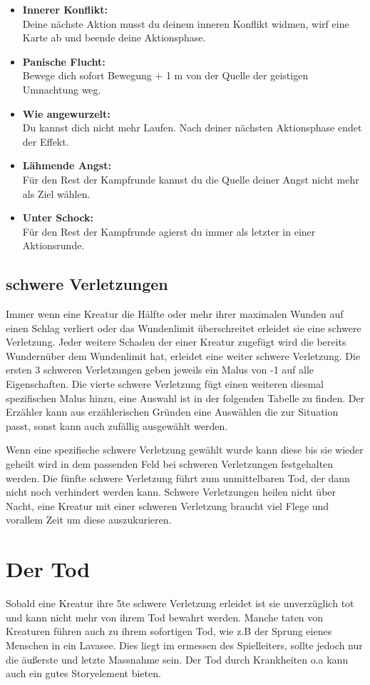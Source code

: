 \begin{itemize}
    \item \textbf{Innerer Konflikt:}\\
    Deine nächste Aktion musst du deinem inneren Konflikt widmen, wirf eine Karte ab und beende deine Aktionsphase.
    \item \textbf{Panische Flucht:}\\
    Bewege dich sofort Bewegung + 1 m von der Quelle der geistigen Umnachtung weg.  
    \item \textbf{Wie angewurzelt:}\\
    Du kannst dich nicht mehr Laufen. Nach deiner nächsten Aktionsphase endet der Effekt.
    \item \textbf{Lähmende Angst:}\\
    Für den Rest der Kampfrunde kannst du die Quelle deiner Angst nicht mehr als Ziel wählen.
    \item \textbf{Unter Schock:}\\
    Für den Rest der Kampfrunde agierst du immer als letzter in einer Aktionsrunde.
\end{itemize}

\subsection*{schwere Verletzungen}
Immer wenn eine Kreatur die Hälfte oder mehr ihrer maximalen Wunden auf einen Schlag verliert oder das Wundenlimit überschreitet erleidet sie eine schwere Verletzung. Jeder weitere Schaden der einer Kreatur zugefügt wird die bereits Wundernüber dem Wundenlimit hat, erleidet eine weiter schwere Verletzung.
Die ersten 3 schweren Verletzungen geben jeweils ein Malus von -1 auf alle Eigenschaften. Die vierte schwere Verletzung fügt einen weiteren diesmal spezifischen Malus hinzu, eine Auswahl ist in der folgenden Tabelle zu finden. Der Erzähler kann aus erzählerischen Gründen eine Auswählen die zur Situation passt, sonst kann auch zufällig ausgewählt werden.

Wenn eine spezifische schwere Verletzung gewählt wurde kann diese bis sie wieder geheilt wird in dem passenden Feld bei schweren Verletzungen festgehalten werden.
Die fünfte schwere Verletzung führt zum unmittelbaren Tod, der dann nicht noch verhindert werden kann.
Schwere Verletzungen heilen nicht über Nacht, eine Kreatur mit einer schweren Verletzung braucht viel Flege und vorallem Zeit um diese auszukurieren. 

\section{Der Tod}
Sobald eine Kreatur ihre 5te schwere Verletzung erleidet ist sie unverzüglich tot und kann nicht mehr von ihrem Tod bewahrt werden.
Manche taten von Kreaturen führen auch zu ihrem sofortigen Tod, wie z.B der Sprung eienes Menschen in ein Lavasee. Dies liegt im ermessen des Spielleiters, sollte jedoch nur die äußerste und letzte Massnahme sein.
Der Tod durch Krankheiten o.a kann auch ein gutes Storyelement bieten.

